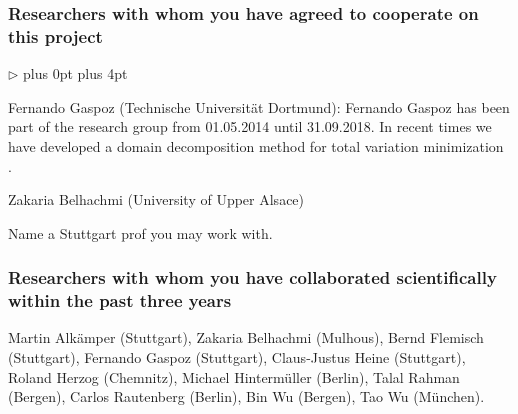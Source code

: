 \documentclass[enabledeprecatedfontcommands,cleardoublepage=empty,headsepline,twoside,11pt,DIV=15,BCOR=12mm,final]{scrartcl}
\renewenvironment{itemize}
{\begin{list}{$\triangleright$}{\labelwidth-2mm \leftmargin3mm %
  \itemsep5pt plus 0pt  \topsep3pt \parsep1pt plus 4pt \labelsep2mm}}
{\end{list}}
\newcommand{\ppdes}{\textsf{pPDEs}\xspace}
\begin{document}
\subsubsection{Researchers with whom you have agreed to cooperate on this project}
\label{sec:rese-with-whom}
\begin{itemize}
\item Fernando Gaspoz (Technische Universit\"at Dortmund): Fernando Gaspoz has been
part of the research group from 01.05.2014 until 31.09.2018. In recent times we have developed a domain decomposition method for total variation minimization \cite{LangerGaspoz:19}.
\item Zakaria Belhachmi (University of Upper Alsace) %
\item Name a Stuttgart prof you may work with.
\end{itemize}


\subsubsection{Researchers with whom you have collaborated scientifically within the past three years}
\label{sec:rese-with-whom-1}
Martin Alk\"amper (Stuttgart), Zakaria Belhachmi (Mulhous), Bernd Flemisch (Stuttgart), Fernando Gaspoz (Stuttgart), Claus-Justus Heine (Stuttgart), Roland Herzog (Chemnitz), Michael Hinterm\"uller (Berlin), %
 Talal Rahman (Bergen), Carlos Rautenberg (Berlin), Bin Wu (Bergen), Tao Wu (M\"unchen). %

\end{document}
